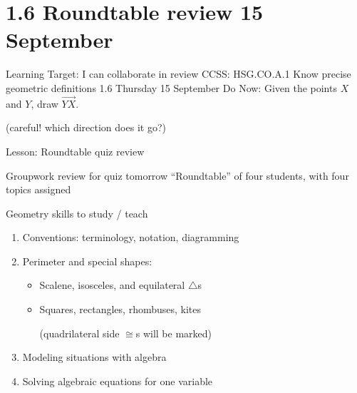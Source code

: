 \section{1.6 Roundtable review \hfill 15 September}
\begin{frame}{Learning Target: I can collaborate in review}
  {CCSS: HSG.CO.A.1 Know precise geometric definitions  \hfill \alert{1.6 Thursday 15 September}}
  Do Now: Given the points $X$ and $Y$, draw $\overrightarrow{YX}$. \par \bigskip
  (careful! which direction does it go?) 
  \vspace{1cm}
  \begin{center}
  \end{center} \vspace{1cm}
  Lesson: Roundtable quiz review
\end{frame}

\begin{frame}{Groupwork review for \alert{quiz tomorrow}}
  {``Roundtable'' of four students, with four topics assigned}
  \begin{block}{Geometry skills to study / teach}
      \begin{enumerate}
    \item Conventions: terminology, notation, diagramming
    \item Perimeter and special shapes: 
    \begin{itemize}
      \item Scalene, isosceles, and equilateral $\triangle$s
      \item Squares, rectangles, rhombuses, kites \par 
      (quadrilateral side $\cong$s will be marked)
    \end{itemize}
    \item Modeling situations with algebra
    \item Solving algebraic equations for one variable
  \end{enumerate}
  \end{block}
  \end{frame}

